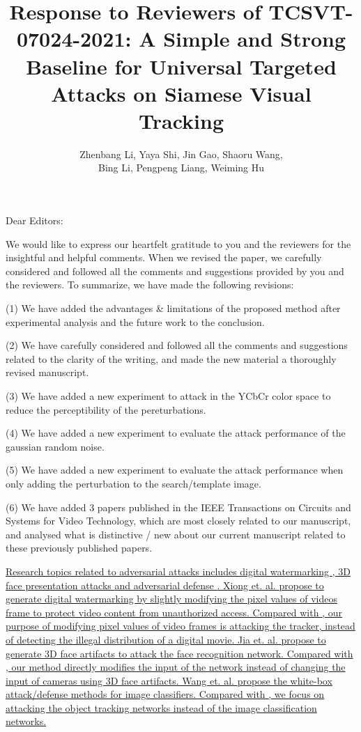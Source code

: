 \documentclass[12pt]{article}
\begin{document}
\linespread{1}
\title{Response to Reviewers of TCSVT-07024-2021: A Simple and Strong Baseline for Universal Targeted Attacks on Siamese Visual Tracking}
\author{Zhenbang Li, Yaya Shi, Jin Gao, Shaoru Wang, \\Bing Li, Pengpeng Liang, Weiming Hu}
\date{}
\maketitle

\noindent Dear Editors:

We would like to express our heartfelt gratitude to you and the reviewers for the insightful and helpful comments. When we revised the paper, we carefully considered and followed all the comments and suggestions provided by you and the reviewers. To summarize, we have made the following revisions:

(1) We have added the advantages \& limitations of the proposed method after experimental analysis and the future work to the conclusion.

(2) We have carefully considered and followed all the comments and suggestions related to the clarity of the writing, and made the new material a thoroughly revised manuscript.

(3) We have added a new experiment to attack in the YCbCr color space to reduce the perceptibility of the pereturbations.


(4) We have added a new experiment to evaluate the attack performance of the gaussian random noise.

(5) We have added a new experiment to evaluate the attack performance when only adding the perturbation to the search/template image.

(6) We have added 3 papers published in the IEEE Transactions on Circuits and Systems for Video Technology, which are most closely related to our manuscript, and analysed what is distinctive / new about our current manuscript related to these previously published papers.

\uline{
Research topics related to adversarial attacks includes digital watermarking \cite{9343885}, 3D face presentation attacks \cite{9294085} and adversarial defense \cite{9169672}.
Xiong et. al. \cite{9343885} propose to generate digital watermarking by slightly modifying the pixel values of videos frame to protect video content from unauthorized access. Compared with \cite{9343885}, our purpose of modifying pixel values of video frames is attacking the tracker, instead of detecting the illegal distribution of a digital movie.
Jia et. al. \cite{9294085} propose to generate 3D face artifacts to attack the face recognition network. Compared with \cite{9294085}, our method directly modifies the input of the network instead of changing the input of cameras using 3D face artifacts.
Wang et. al. \cite{9169672} propose the white-box attack/defense methods for image classifiers. Compared with \cite{9169672}, we focus on attacking the object tracking networks instead of the image classification networks.
}
\end{document}
